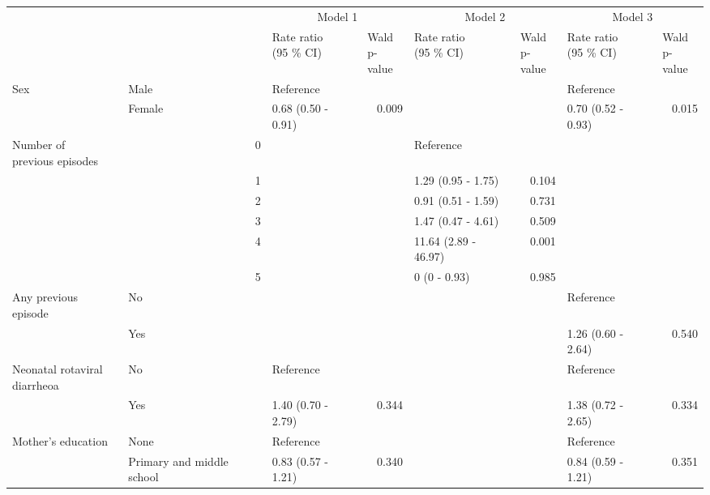 \documentclass[11pt,a4paper]{article}\usepackage{graphicx, color}
\begin{document}
\begin{sidewaystable}[p]
\begin{center}
\begin{tabular}{llllllll}
\toprule
 &  & \multicolumn{ 2}{c}{Model 1} & \multicolumn{ 2}{c}{Model 2} & \multicolumn{ 2}{c}{Model 3} \\ 
 &  & \shortstack{Rate ratio \\(95 \% CI)} & \shortstack{Wald \\p-value} & \shortstack{Rate ratio \\(95 \% CI)} & \shortstack{Wald \\p-value} & \shortstack{Rate ratio \\(95 \% CI)} & \shortstack{Wald \\p-value} \\ 
 \midrule
Sex & Male & Reference &  &  &  & Reference &  \\ 
 & Female & 0.68 (0.50 - 0.91) & \multicolumn{1}{r}{0.009} &  &  & 0.70 (0.52 - 0.93) & \multicolumn{1}{r}{0.015} \\ 
\shortstack{Number of \\ previous episodes} & \multicolumn{1}{r}{0} &  &  & Reference &  &  &  \\ 
 & \multicolumn{1}{r}{1} &  &  & 1.29 (0.95 - 1.75) & \multicolumn{1}{r}{0.104} &  &  \\ 
 & \multicolumn{1}{r}{2} &  &  & 0.91 (0.51 - 1.59) & \multicolumn{1}{r}{0.731} &  &  \\ 
 & \multicolumn{1}{r}{3} &  &  & 1.47 (0.47 - 4.61) & \multicolumn{1}{r}{0.509} &  &  \\ 
 & \multicolumn{1}{r}{4} &  &  & 11.64 (2.89 - 46.97) & \multicolumn{1}{r}{0.001} &  &  \\ 
 & \multicolumn{1}{r}{5} &  &  & 0 (0 - 0.93) & \multicolumn{1}{r}{0.985} &  &  \\ 
Any previous episode & No &  &  &  &  & Reference &  \\ 
 & Yes &  &  &  &  & 1.26 (0.60 - 2.64) & \multicolumn{1}{r}{0.540} \\ 
\shortstack{Neonatal rotaviral \\ diarrheoa} & No & Reference &  &  &  & Reference &  \\ 
 & Yes & 1.40 (0.70 - 2.79) & \multicolumn{1}{r}{0.344} &  &  & 1.38 (0.72 - 2.65) & \multicolumn{1}{r}{0.334} \\ 
Mother's education & None & Reference &  &  &  & Reference &  \\ 
 & Primary and middle school & 0.83 (0.57 - 1.21) & \multicolumn{1}{r}{0.340} &  &  & 0.84 (0.59 - 1.21) & \multicolumn{1}{r}{0.351} \\ 

\end{tabular}
\end{center}
\end{sidewaystable}
\end{document}
